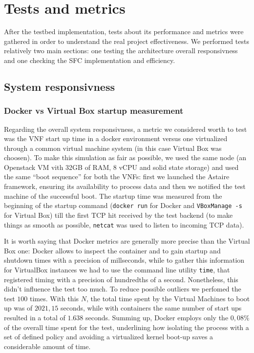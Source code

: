 \chapter{Tests and metrics}

After the testbed implementation, tests about its performance and metrics were
gathered in order to understand the real project effectiveness. We performed
tests relatively two main sections: one testing the architecture overall
responsivness and one checking the SFC implementation and efficiency.

\section{System responsivness}

\subsection{Docker vs Virtual Box startup measurement}

Regarding the overall system responsivness, a metric we considered worth to 
test was the VNF start up time in a docker environment versus one virtualized 
through a common virtual machine system (in this case Virtual Box was choosen). 
To make this simulation as fair as possible, we used the same node (an 
Openstack VM vith 32GB of RAM, 8 vCPU and solid state storage) and used the same 
``boot sequence'' for both the VNFs: first we launched the Astaire framework, 
ensuring its availability to process data and then we notified the test 
machine of the successful boot. The startup time was measured from the 
beginning of the startup command (\verb!docker run! for Docker and 
\verb!VBoxManage -s! for Virtual Box) till the first TCP hit received by the 
test backend (to make things as smooth as possible, \verb!netcat! was used 
to listen to incoming TCP data).

It is worth saying that Docker metrics are generally more precise than the
Virtual Box one: Docker allows to inspect the container and to gain startup and
shutdown times with a precision of millseconds, while to gather this information
for VirtualBox instances we had to use the command line utility \verb!time!,
that registered timing with a precision of hundredths of a second. Nonetheless,
this didn't influence the test too much. To reduce possible outliers we perfomed
the test $100$ times. With this $N$, the total time spent by the Virtual
Machines to boot up was of $2021,15$ seconds, while with containers the same
number of start ups resulted in a total of $1.638$ seconds. Summing up, Docker
employs only the $0,08\%$ of the overall time spent for the test, underlining
how isolating the process with a set of defined policy and avoiding a
virtualized kernel boot-up saves a considerable amount of time.

